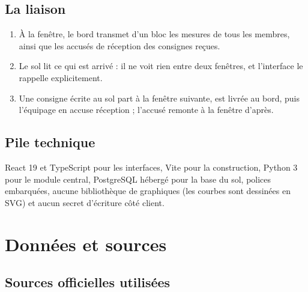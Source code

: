 \documentclass[11pt,a4paper]{article}
\let\sectionorig\section
\renewcommand{\section}{\Needspace{5\baselineskip}\sectionorig}
\begin{document}
\subsection{La liaison}

\begin{enumerate}
  \item \`A la fen\^etre, le bord transmet d'un bloc les mesures de tous les membres, ainsi que les
        accus\'es de r\'eception des consignes re\c{c}ues.
  \item Le sol lit ce qui est arriv\'e : il ne voit rien entre deux fen\^etres, et l'interface le
        rappelle explicitement.
  \item Une consigne \'ecrite au sol part \`a la fen\^etre suivante, est livr\'ee au bord, puis
        l'\'equipage en accuse r\'eception ; l'accus\'e remonte \`a la fen\^etre d'apr\`es.
\end{enumerate}

\subsection{Pile technique}

React 19 et TypeScript pour les interfaces, Vite pour la construction, Python 3 pour le module
central, PostgreSQL h\'eberg\'e pour la base du sol, polices embarqu\'ees, aucune biblioth\`eque de
graphiques (les courbes sont dessin\'ees en SVG) et aucun secret d'\'ecriture c\^ot\'e client.

\section{Donn\'ees et sources}

\subsection{Sources officielles utilis\'ees}
\end{document}
